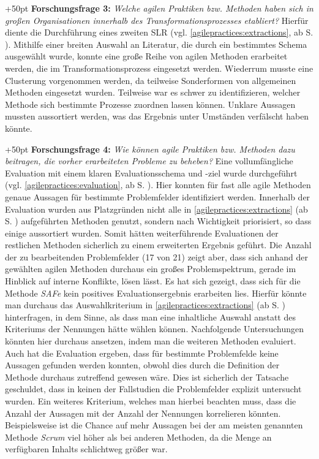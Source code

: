 \hangindent+50pt 
\textbf{Forschungsfrage 3:} \textit{Welche agilen Praktiken bzw. Methoden haben sich in großen Organisationen innerhalb des Transformationsprozesses etabliert?
} Hierfür diente die Durchführung eines zweiten SLR (vgl. \ref{agilepractices:extractions}, ab S. \pageref{agilepractices:extractions}). Mithilfe einer breiten Auswahl an Literatur, die durch ein bestimmtes Schema ausgewählt wurde, konnte eine große Reihe von agilen Methoden erarbeitet werden, die im Transformationsprozess eingesetzt werden. Wiederrum musste eine Clusterung vorgenommen werden, da teilweise Sonderformen von allgemeinen Methoden eingesetzt wurden. Teilweise war es schwer zu identifizieren, welcher Methode sich bestimmte Prozesse zuordnen lassen können. Unklare Aussagen mussten aussortiert werden, was das Ergebnis unter Umständen verfälscht haben könnte.

\hangindent+50pt 
\textbf{Forschungsfrage 4:} \textit{Wie können agile Praktiken bzw. Methoden dazu beitragen, die vorher erarbeiteten Probleme zu beheben?} Eine vollumfängliche Evaluation mit einem klaren Evaluationsschema und -ziel wurde durchgeführt (vgl. \ref{agilepractices:evaluation}, ab S. \pageref{agilepractices:evaluation}). Hier konnten für fast alle agile Methoden genaue Aussagen für bestimmte Problemfelder identifiziert werden. Innerhalb der Evaluation wurden aus Platzgründen nicht alle in \ref{agilepractices:extractions} (ab S. \pageref{agilepractices:extractions}) aufgeführten Methoden genutzt, sondern nach Wichtigkeit priorisiert, so dass einige aussortiert wurden. Somit hätten weiterführende Evaluationen der restlichen Methoden sicherlich zu einem erweiterten Ergebnis geführt. Die Anzahl der zu bearbeitenden Problemfelder (17 von 21) zeigt aber, dass sich anhand der gewählten agilen Methoden durchaus ein großes Problemspektrum, gerade im Hinblick auf interne Konflikte, lösen lässt. Es hat sich gezeigt, dass sich für die Methode \textit{SAFe} kein positives Evaluationsergebnis erarbeiten lies. Hierfür könnte man durchaus das Auswahlkriterium in \ref{agilepractices:extractions} (ab S. \pageref{agilepractices:extractions}) hinterfragen, in dem Sinne, als dass man eine inhaltliche Auswahl anstatt des Kriteriums der Nennungen hätte wählen können. Nachfolgende Untersuchungen könnten hier durchaus ansetzen, indem man die weiteren Methoden evaluiert. Auch hat die Evaluation ergeben, dass für bestimmte Problemfelde keine Aussagen gefunden werden konnten, obwohl dies durch die Definition der Methode durchaus zutreffend gewesen wäre. Dies ist sicherlich der Tatsache geschuldet, dass in keinen der Fallstudien die Problemfelder explizit untersucht wurden. Ein weiteres Kriterium, welches man hierbei beachten muss, dass die Anzahl der Aussagen mit der Anzahl der Nennungen korrelieren könnten. Beispielsweise ist die Chance auf mehr Aussagen bei der am meisten genannten Methode  \textit{Scrum} viel höher als bei anderen Methoden, da die Menge an verfügbaren Inhalts schlichtweg größer war. 

